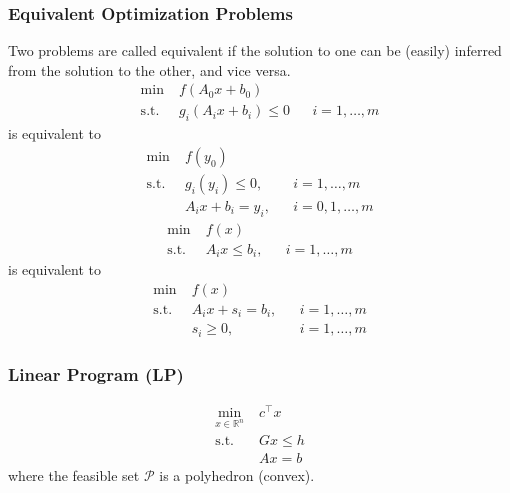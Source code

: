 \subsubsection{Equivalent Optimization Problems}
Two problems are called equivalent if the solution to one can be (easily) inferred from the solution to the other, and vice versa.
\newpar{}
\begin{align*}
    \min\;           & f(A_0x + b_0)                               \\
    \mathrm{s.t.} \; & g_i(A_i x + b_i) \leq 0 &  & i = 1,\ldots,m
\end{align*}
is equivalent to
\begin{align*}
    \min\;          & f(y_0)                                   \\
    \mathrm{s.t.}\; & g_i(y_i) \leq 0,   &  & i = 1,\ldots,m   \\
                    & A_i x + b_i = y_i, &  & i = 0,1,\ldots,m
\end{align*}
\newpar{}
\begin{align*}
    \min\;          & f(x)                                \\
    \mathrm{s.t.}\; & A_i x \leq b_i, &  & i = 1,\ldots,m
\end{align*}
is equivalent to
\begin{align*}
    \min\;          & f(x)                                 \\
    \mathrm{s.t.}\; & A_i x +s_i= b_i, &  & i = 1,\ldots,m \\
                    & s_i \geq 0,      &  & i = 1,\ldots,m
\end{align*}

\subsubsection{Linear Program (LP)}\label{optimizer_location_LP}
\noindent
\begin{align*}
    \min_{x\in\mathbb{R}^n}\; & c^\top x  \\
    \mathrm{s.t.}\;           & Gx \leq h \\
                              & Ax = b
\end{align*}
where the feasible set $\mathcal{P}$ is a polyhedron (convex).

